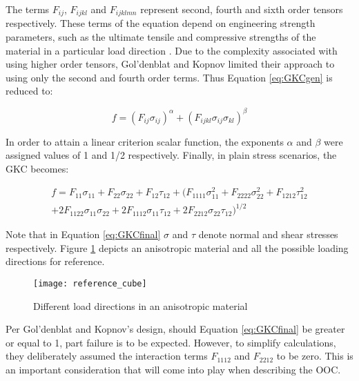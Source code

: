 \documentclass[main.tex]{subfiles}
\begin{document}
The terms $F_{ij}$, $F_{ijkl}$ and $F_{ijklmn}$ represent second, fourth and sixth order tensors respectively. These terms of the equation depend on engineering strength parameters, such as the ultimate tensile and compressive strengths of the material in a particular load direction \cite{Osswald2017a}. Due to the complexity associated with using higher order tensors, Gol'denblat and Kopnov limited their approach to using only the second and fourth order terms. Thus Equation \ref{eq:GKCgen} is reduced to:

\begin{equation} \label{eq:GKCgenTrunc}
f=(F_{ij}\sigma_{ij})^\alpha + (F_{ijkl}\sigma_{ij}\sigma_{kl})^\beta
\end{equation}

In order to attain a linear criterion scalar function, the exponents $\alpha$ and $\beta$ were assigned values of 1 and 1/2 respectively. Finally, in plain stress scenarios, the GKC becomes:

\begin{equation} \label{eq:GKCfinal}
\begin{split}
f=F_{11}\sigma_{11} + F_{22}\sigma_{22} + F_{12}\tau_{12} + (F_{1111}\sigma_{11}^{2} + F_{2222}\sigma_{22}^{2} + F_{1212}\tau_{12}^{2} \\ + 2F_{1122}\sigma_{11}\sigma_{22} + 2F_{1112}\sigma_{11}\tau_{12} + 2F_{2212}\sigma_{22}\tau_{12})^{1/2}
\end{split}
\end{equation}

Note that in Equation \ref{eq:GKCfinal} $\sigma$ and $\tau$ denote normal and shear stresses respectively. Figure \ref{fig:loaddir} depicts an anisotropic material and all the possible loading directions for reference.

\begin{figure}[h]
	\center
	\texttt{[image: reference\_cube]}
	\caption{Different load directions in an anisotropic material} \label{fig:loaddir}
\end{figure}

Per Gol'denblat and Kopnov's design, should Equation \ref{eq:GKCfinal} be greater or equal to 1, part failure is to be expected. However, to simplify calculations, they deliberately assumed the interaction terms $F_{1112}$ and $F_{2212}$ to be zero. This is an important consideration that will come into play when describing the OOC.
\end{document}
